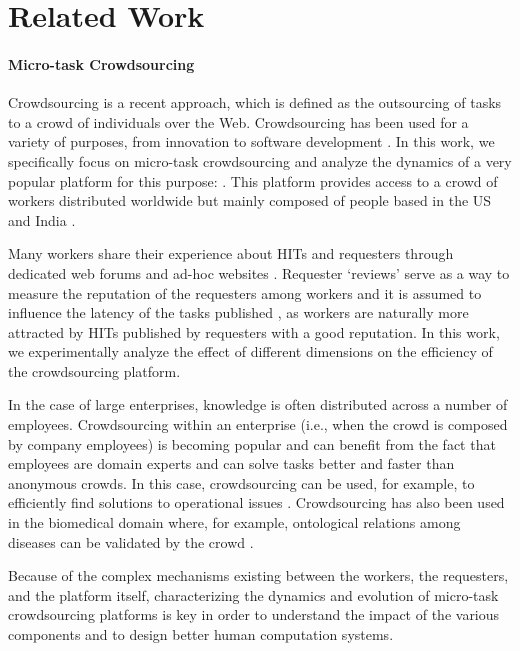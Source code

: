 \section{Related Work}\label{sec:relwork}

\paragraph{Micro-task Crowdsourcing}
Crowdsourcing is a recent approach, which is defined as the  outsourcing of tasks  to a crowd of individuals over the Web. Crowdsourcing has  been used for a variety of purposes, from innovation to software development \cite{platforms}.
% 
In this work, we specifically focus on micro-task crowdsourcing and analyze the dynamics of a  very popular  platform for this purpose: \amt{}. This platform provides access to a crowd of workers distributed worldwide but mainly composed of people based in the US and India \cite{mturk}.

Many \amt{} workers share their experience about HITs and requesters through dedicated web forums and ad-hoc websites \cite{turkopticon}. Requester `reviews' serve as a way to measure the reputation of the requesters among workers and it is assumed to influence the latency of the tasks published \cite{TOreputation}, as workers are naturally more attracted by HITs published by  requesters with a good reputation.
% 
In this work, we experimentally analyze the effect of different dimensions on the efficiency of the crowdsourcing platform.

In the case of large enterprises,  knowledge is often distributed across a number of employees. Crowdsourcing within an enterprise (i.e., when the crowd is composed by company employees) is  becoming popular and can benefit from the fact that employees are domain experts and can solve tasks better and faster than anonymous crowds. In this case, crowdsourcing can be used, for example, to efficiently find solutions to operational issues  \cite{enterprisecrowdsourcing}. 
% 
Crowdsourcing has also been used in the biomedical domain where, for example,  ontological relations among diseases can be validated by the crowd \cite{bioonto,biomedical}.

Because of the complex mechanisms existing between the workers, the requesters, and the platform itself, characterizing the dynamics and evolution of micro-task crowdsourcing platforms is key in order to understand the impact of the various components and to design better human computation systems.



